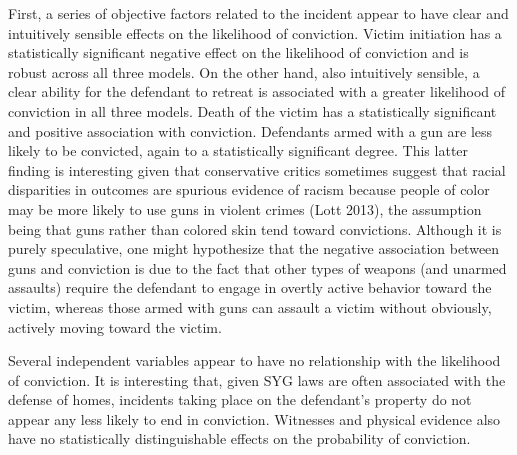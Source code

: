 \documentclass[12pt,article]{article}
\begin{document}
First, a series of objective factors related to the incident appear to
have clear and intuitively sensible effects on the likelihood of
conviction. Victim initiation has a statistically significant negative effect on the likelihood of conviction and is
robust across all three models. On the other hand, also intuitively
sensible, a clear ability for the defendant to retreat is associated
with a greater likelihood of conviction in all three
models. Death of the victim has a statistically significant and positive association with conviction.
Defendants armed with a gun are less likely to be convicted, again to a statistically significant degree. This latter finding is interesting given that conservative critics sometimes suggest that
racial disparities in outcomes are spurious evidence of racism because
people of color may be more likely to use guns in violent crimes (Lott
2013), the assumption being that guns rather than colored skin tend
toward convictions. Although it is purely speculative, one might
hypothesize that the negative association between guns and conviction is
due to the fact that other types of weapons (and unarmed assaults)
require the defendant to engage in overtly active behavior toward the
victim, whereas those armed with guns can assault a victim without
obviously, actively moving toward the victim.

Several independent variables appear to have no relationship with the
likelihood of conviction. It is interesting that, given SYG laws are
often associated with the defense of homes, incidents taking place on
the defendant's property do not appear any less likely to end in
conviction. Witnesses and physical evidence also have no statistically distinguishable effects on
the probability of conviction.
\end{document}
